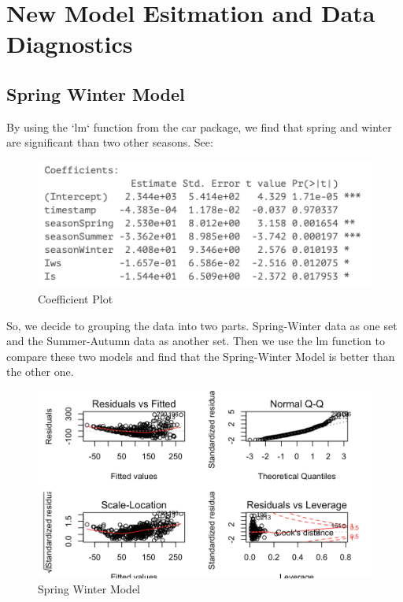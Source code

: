 
\chapter{New Model Esitmation and Data Diagnostics} %

\label{Chapter 4} %
\section{Spring Winter Model}
By using the `lm` function from the car package, we find that spring and winter are significant than two other seasons. See:  

\begin{figure}[H]
  \centering
  \includegraphics[width = 1.0\textwidth]{Figures/coef_full.png}
  \caption[Figures/coef\_full.png]{Coefficient Plot}
  \label{fig:Coefficient Plot}
\end{figure}

So, we decide to grouping the data into two parts. Spring-Winter data as one set and the Summer-Autumn data as another set. Then we use the lm function to compare these two models and find that the Spring-Winter Model is better than the other one.

\begin{figure}[H]
  \centering
  \includegraphics[width = 1.0\textwidth]{Figures/spring_winter.png}
  \caption[Figures/spring\_winter.png]{Spring Winter Model}
  \label{fig:Spring_Winter Model}
\end{figure}


